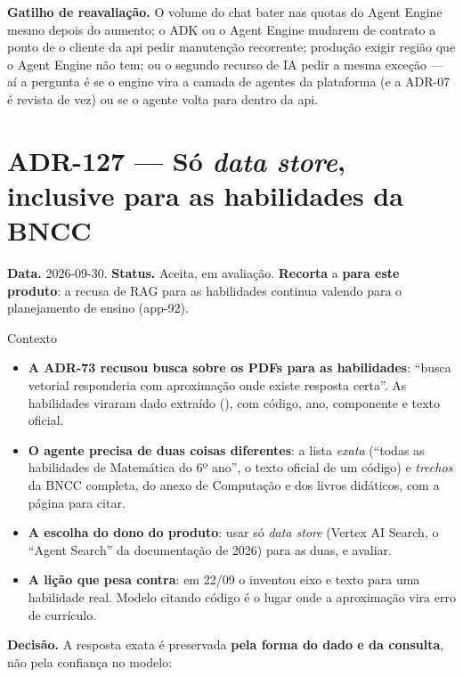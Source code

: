 \textbf{Gatilho de reavaliação.} O volume do chat bater nas quotas do Agent
Engine mesmo depois do aumento; o ADK ou o Agent Engine mudarem de contrato a
ponto de o cliente da api pedir manutenção recorrente; produção exigir região que
o Agent Engine não tem; ou o segundo recurso de IA pedir a mesma exceção --- aí a
pergunta é se o engine vira a camada de agentes da plataforma (e a ADR-07 é
revista de vez) ou se o agente volta para dentro da api.

\section{ADR-127 --- Só \emph{data store}, inclusive para as habilidades da BNCC}
\label{adr:agente-professor-data-store}

\textbf{Data.} 2026-09-30. \textbf{Status.} Aceita, em avaliação.
\textbf{Recorta} a  \textbf{para este produto}: a recusa de RAG para
as habilidades continua valendo para o planejamento de ensino (app-92).

\begin{especificacao}{Contexto}
\begin{itemize}
  \item \textbf{A ADR-73 recusou busca sobre os PDFs para as habilidades}:
    \enquote{busca vetorial responderia com aproximação onde existe resposta
    certa}. As habilidades viraram dado extraído (), com
    código, ano, componente e texto oficial.
  \item \textbf{O agente precisa de duas coisas diferentes}: a lista
    \emph{exata} (\enquote{todas as habilidades de Matemática do 6º ano}, o
    texto oficial de um código) e \emph{trechos} da BNCC completa, do anexo de
    Computação e dos livros didáticos, com a página para citar.
  \item \textbf{A escolha do dono do produto}: usar só \emph{data store} (Vertex
    AI Search, o \enquote{Agent Search} da documentação de 2026) para as duas, e
    avaliar.
  \item \textbf{A lição que pesa contra}: em 22/09 o 
    inventou eixo e texto para uma habilidade real. Modelo citando código é o
    lugar onde a aproximação vira erro de currículo.
\end{itemize}
\end{especificacao}

\textbf{Decisão.} A resposta exata é preservada \textbf{pela forma do dado e da
consulta}, não pela confiança no modelo:

